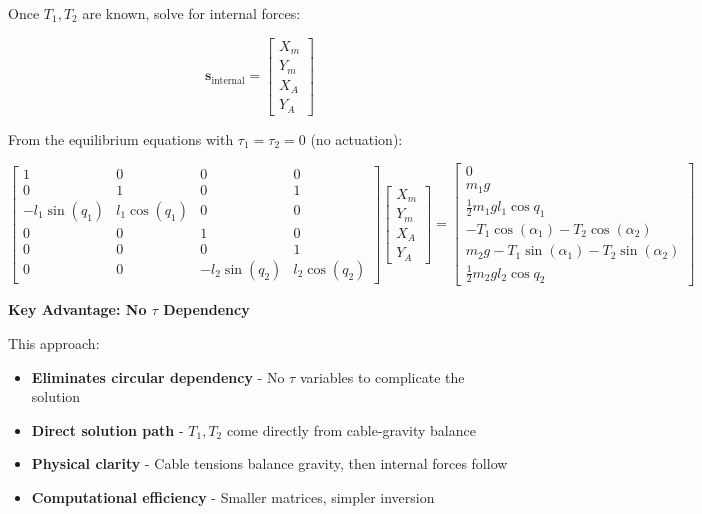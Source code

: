Once $T_1, T_2$ are known, solve for internal forces:

\begin{equation}
\mathbf{s}_{\text{internal}} = \begin{bmatrix} X_m \\ Y_m \\ X_A \\ Y_A \end{bmatrix}
\end{equation}

From the equilibrium equations with $\tau_1 = \tau_2 = 0$ (no actuation):

\begin{equation}
\begin{bmatrix}
1 & 0 & 0 & 0 \\
0 & 1 & 0 & 1 \\
-l_1\sin(q_1) & l_1\cos(q_1) & 0 & 0 \\
0 & 0 & 1 & 0 \\
0 & 0 & 0 & 1 \\
0 & 0 & -l_2\sin(q_2) & l_2\cos(q_2)
\end{bmatrix}
\begin{bmatrix} X_m \\ Y_m \\ X_A \\ Y_A \end{bmatrix} = 
\begin{bmatrix} 0 \\ m_1 g \\ \frac{1}{2} m_1 g l_1 \cos q_1 \\ -T_1 \cos(\alpha_1) - T_2 \cos(\alpha_2) \\ m_2 g - T_1 \sin(\alpha_1) - T_2 \sin(\alpha_2) \\ \frac{1}{2} m_2 g l_2 \cos q_2 \end{bmatrix}
\end{equation}

\textbf{Key Advantage: No $\tau$ Dependency}

This approach:
\begin{itemize}
    \item \textbf{Eliminates circular dependency} - No $\tau$ variables to complicate the solution
    \item \textbf{Direct solution path} - $T_1, T_2$ come directly from cable-gravity balance  
    \item \textbf{Physical clarity} - Cable tensions balance gravity, then internal forces follow
    \item \textbf{Computational efficiency} - Smaller matrices, simpler inversion
\end{itemize}

